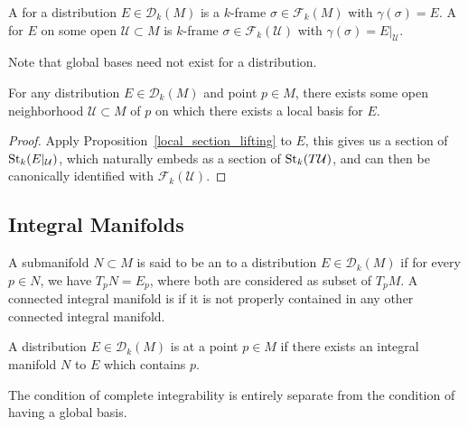 \documentclass{lkx_paper}
\begin{document}
\begin{definition}
	A  for a distribution $E\in \mathscr{D}_k(M)$ is a $k$-frame $\sigma\in \mathscr{F}_k(M)$ with $\gamma(\sigma)=E$. A  for $E$ on some open $\mathcal{U}\subset M$ is $k$-frame $\sigma\in \mathscr{F}_k(\mathcal{U})$ with $\gamma(\sigma)=E|_\mathcal{U}$.
\end{definition}

Note that global bases need not exist for a distribution.

\begin{example}
\end{example}

\begin{proposition}
	For any distribution $E\in \mathscr{D}_k(M)$ and point $p\in M$, there exists some open neighborhood $\mathcal{U}\subset M$ of $p$ on which there exists a local basis for $E$.
\end{proposition}

\begin{proof}
	Apply Proposition~\ref{local_section_lifting} to $E$, this gives us a section of $\mathrm{St}_k(E|_\mathcal{U})$, which naturally embeds as a section of $\mathrm{St}_k(T\mathcal{U})$, and can then be canonically identified with $\mathcal{F}_k(\mathcal{U})$.
\end{proof}

\subsection{Integral Manifolds}

\begin{definition}
	A submanifold $N\subset M$ is said to be an  to a distribution $E\in \mathscr{D}_k(M)$ if for every $p\in N$, we have $T_p N = E_p$, where both are considered as subset of $T_p M$. A connected integral manifold is  if it is not properly contained in any other connected integral manifold.
\end{definition}

\begin{definition}
	A distribution $E \in \mathscr{D}_k(M)$ is  at a point $p\in M$ if there exists an integral manifold $N$ to $E$ which contains $p$.
\end{definition}

The condition of complete integrability is entirely separate from the condition of having a global basis.
\end{document}
